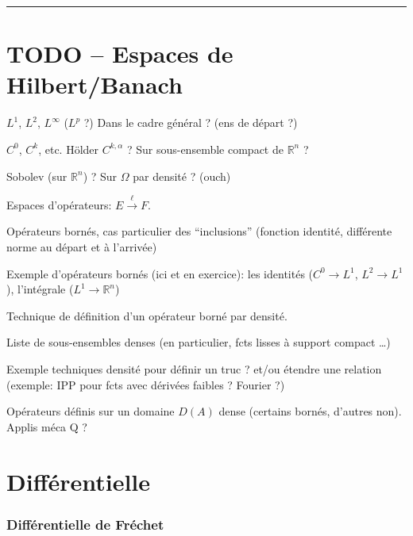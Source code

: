 \documentclass[french,]{article}
\begin{document}
\newcommand{\N}{\mathbb{N}}
\newcommand{\Z}{\mathbb{Z}}
\newcommand{\Q}{\mathbb{Q}}
\newcommand{\R}{\mathbb{R}}
\renewcommand{\C}{\mathbb{C}}

\begin{center}\rule{0.5\linewidth}{\linethickness}\end{center}

\hypertarget{todo-espaces-de-hilbertbanach}{%
\section{TODO -- Espaces de
Hilbert/Banach}\label{todo-espaces-de-hilbertbanach}}

\(L^1\), \(L^2\), \(L^{\infty}\) (\(L^p\) ?) Dans le cadre général ?
(ens de départ ?)

\(C^0\), \(C^k\), etc. Hölder \(C^{k,\alpha}\) ? Sur sous-ensemble
compact de \(\mathbb{R}^n\) ?

Sobolev (sur \(\mathbb{R}^n\)) ? Sur \(\Omega\) par densité ? (ouch)

Espaces d'opérateurs: \(E \stackrel{\ell}{\to } F\).

Opérateurs bornés, cas particulier des ``inclusions'' (fonction
identité, différente norme au départ et à l'arrivée)

Exemple d'opérateurs bornés (ici et en exercice): les identités
(\(C^0 \to L^1\), \(L^2 \to L^1\)), l'intégrale
(\(L^1 \to \mathbb{R}^n\))

Technique de définition d'un opérateur borné par densité.

Liste de sous-ensembles denses (en particulier, fcts lisses à support
compact \ldots{})

Exemple techniques densité pour définir un truc ? et/ou étendre une
relation (exemple: IPP pour fcts avec dérivées faibles ? Fourier ?)

Opérateurs définis sur un domaine \(D(A)\) dense (certains bornés,
d'autres non). Applis méca Q ?

\hypertarget{diffuxe9rentielle}{%
\section{Différentielle}\label{diffuxe9rentielle}}

\hypertarget{diffuxe9rentielle-de-fruxe9chet}{%
\subsubsection{Différentielle de
Fréchet}\label{diffuxe9rentielle-de-fruxe9chet}}
\end{document}

